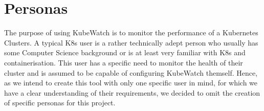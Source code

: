 \section{Personas}

The purpose of using KubeWatch is to monitor the performance of a Kubernetes Clusters. A typical K8s user is a rather technically adept person who usually has some Computer Science background or is at least very familiar with K8s and containerisation. This user has a specific need to monitor the health of their cluster and is assumed to be capable of configuring KubeWatch themself. Hence, as we intend to create this tool with only one specific user in mind, for which we have a clear understanding of their requirements, we decided to omit the creation of specific personas for this project.

